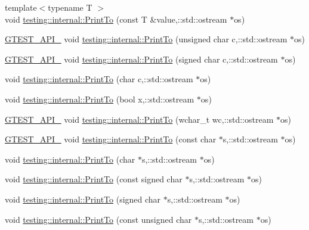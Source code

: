 \begin{DoxyCompactItemize}
\item 
{\footnotesize template$<$typename T $>$ }\\void \hyperlink{namespacetesting_1_1internal_a46859938b459a1581ec760755bc81fc7}{testing\+::internal\+::\+Print\+To} (const T \&value,\+::std\+::ostream $\ast$os)
\item 
\hyperlink{gtest-port_8h_aa73be6f0ba4a7456180a94904ce17790}{G\+T\+E\+S\+T\+\_\+\+A\+P\+I\+\_\+} void \hyperlink{namespacetesting_1_1internal_ad75960e2329e424819e3f414b7f432f7}{testing\+::internal\+::\+Print\+To} (unsigned char c,\+::std\+::ostream $\ast$os)
\item 
\hyperlink{gtest-port_8h_aa73be6f0ba4a7456180a94904ce17790}{G\+T\+E\+S\+T\+\_\+\+A\+P\+I\+\_\+} void \hyperlink{namespacetesting_1_1internal_aaaa417e593ae34220fa06c7b96f5f1d4}{testing\+::internal\+::\+Print\+To} (signed char c,\+::std\+::ostream $\ast$os)
\item 
void \hyperlink{namespacetesting_1_1internal_ae91b06a9e343f5ddabff85626a7d507a}{testing\+::internal\+::\+Print\+To} (char c,\+::std\+::ostream $\ast$os)
\item 
void \hyperlink{namespacetesting_1_1internal_a832beb8c56070fc5c175b8bfd8bbeba0}{testing\+::internal\+::\+Print\+To} (bool x,\+::std\+::ostream $\ast$os)
\item 
\hyperlink{gtest-port_8h_aa73be6f0ba4a7456180a94904ce17790}{G\+T\+E\+S\+T\+\_\+\+A\+P\+I\+\_\+} void \hyperlink{namespacetesting_1_1internal_a3802453cf4e3f4870f589c69c7b43b2b}{testing\+::internal\+::\+Print\+To} (wchar\+\_\+t wc,\+::std\+::ostream $\ast$os)
\item 
\hyperlink{gtest-port_8h_aa73be6f0ba4a7456180a94904ce17790}{G\+T\+E\+S\+T\+\_\+\+A\+P\+I\+\_\+} void \hyperlink{namespacetesting_1_1internal_afc6dad64c4dd4799036f252c07d8a59f}{testing\+::internal\+::\+Print\+To} (const char $\ast$s,\+::std\+::ostream $\ast$os)
\item 
void \hyperlink{namespacetesting_1_1internal_ae04a499cedbda0b244c216211081a8b6}{testing\+::internal\+::\+Print\+To} (char $\ast$s,\+::std\+::ostream $\ast$os)
\item 
void \hyperlink{namespacetesting_1_1internal_af4616278b2c3ac265ad80481e0ce8da7}{testing\+::internal\+::\+Print\+To} (const signed char $\ast$s,\+::std\+::ostream $\ast$os)
\item 
void \hyperlink{namespacetesting_1_1internal_abac47db29a65b1633028fe8001f57212}{testing\+::internal\+::\+Print\+To} (signed char $\ast$s,\+::std\+::ostream $\ast$os)
\item 
void \hyperlink{namespacetesting_1_1internal_a96409c0b7d8ce520c40a0aa5eb9280b6}{testing\+::internal\+::\+Print\+To} (const unsigned char $\ast$s,\+::std\+::ostream $\ast$os)

\end{DoxyCompactItemize}
